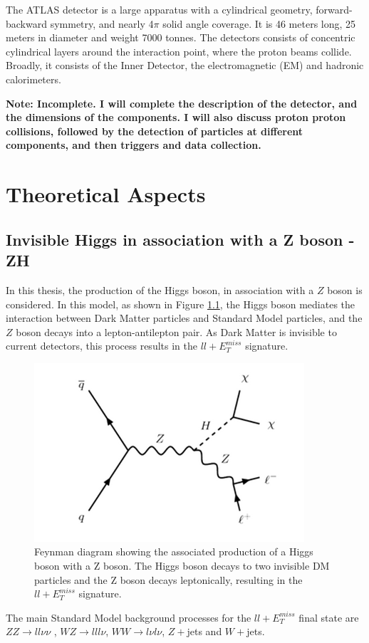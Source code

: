 \documentclass[11pt,a4paper,openright,twoside]{report}
\newcommand{\ZZ}{$ZZ\to ll\nu\nu$ }
\newcommand{\met}{$E_T^{miss}$ }
\begin{document}
The ATLAS detector is a large apparatus with a cylindrical geometry, forward-backward symmetry, and nearly 4$\pi$ solid angle coverage. It is 46 meters long, 25 meters in diameter and weight 7000 tonnes. The detectors consists of concentric cylindrical layers around the interaction point, where the proton beams collide. Broadly, it consists of the  Inner Detector, the electromagnetic (EM) and hadronic calorimeters.

\textbf{Note: Incomplete. I will complete the description of the detector, and the dimensions of the components. I will also discuss proton proton collisions, followed by the detection of particles at different components, and then triggers and data collection.}

\chapter{Theoretical Aspects}\label{ch:theory}
\section{Invisible Higgs in association with a Z boson - ZH}
In this thesis, the production of the Higgs boson, in association with a $Z$ boson is considered. In this model, as shown in Figure \ref{fig:HZ}, the Higgs boson mediates the interaction between Dark Matter particles and Standard Model particles, and the $Z$ boson decays into a lepton-antilepton pair. As Dark Matter is invisible to current detectors, this process results in the $ll+$\met signature.
\begin{figure}[H]
\centering
	\includegraphics[width=0.5\linewidth]{HZ.png}
	\caption{Feynman diagram showing the associated production of a Higgs boson with a Z boson. The Higgs boson decays to two invisible DM particles and the Z boson decays leptonically, resulting in the $ll+ E_T^{miss}$ signature.}
		\label{fig:HZ}
\end{figure}
The main Standard Model background processes for the $ll+$\met final state are \ZZ, $WZ\to lll\nu$, $WW\to l\nu l\nu$, $Z+$jets and $W+$jets. 
\end{document}
